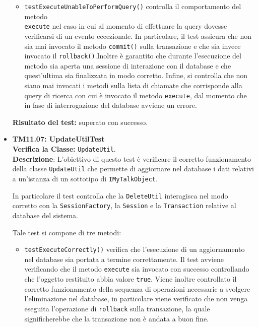 \begin{itemize}
\begin{itemize}
\item \texttt{testExecuteUnableToPerformQuery()} controlla il comportamento del metodo \\ \texttt{execute} nel caso in cui al momento di effettuare la query dovesse verificarsi di un evento eccezionale. In particolare, il test assicura che non sia mai invocato il metodo \texttt{commit()} sulla transazione e che sia invece invocato il \texttt{rollback()}.Inoltre è garantito che durante l'esecuzione del metodo sia aperta una sessione di interazione con il database e che quest'ultima sia finalizzata in modo corretto. Infine, si controlla che non siano mai invocati i metodi sulla lista di chiamate che corrisponde alla query di ricerca con cui è invocato il metodo \texttt{execute}, dal momento che in fase di interrogazione del database avviene un errore.

\end{itemize}
\textbf{Risultato del test:} superato con successo.


\item \textbf{TM11.07: UpdateUtilTest}\\
\textbf{Verifica la Classe:} \texttt{UpdateUtil}.\\
\textbf{Descrizione}: L'obiettivo di questo test è verificare il corretto funzionamento della classe \texttt{UpdateUtil} che permette di aggiornare nel database i dati relativi a un'istanza di un sottotipo di \texttt{IMyTalkObject}.

In particolare il test controlla che la \texttt{DeleteUtil} interagisca nel modo corretto con la \texttt{SessionFactory}, la \texttt{Session} e la \texttt{Transaction} relative al database del sistema.

Tale test si compone di tre metodi:
\begin{itemize}
\item \texttt{testExecuteCorrectly()} verifica che l'esecuzione di un aggiornamento nel database sia portata a termine correttamente. Il test avviene verificando che il metodo \texttt{execute} sia invocato con successo controllando che l'oggetto restituito abbia valore \texttt{true}. Viene inoltre controllato il corretto funzionamento della sequenza di operazioni necessarie a svolgere l'eliminazione nel database, in particolare viene verificato che non venga eseguita l'operazione di \texttt{rollback} sulla transazione, la quale significherebbe che la transazione non è andata a buon fine.


\end{itemize}
\end{itemize}
